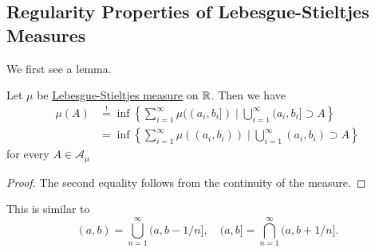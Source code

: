 \subsection{Regularity Properties of Lebesgue-Stieltjes Measures}
We first see a lemma.
\begin{lemma}
	Let \(\mu\) be \hyperref[def:Lebesgue-Stieltjes-measure]{Lebesgue-Stieltjes measure} on \(\mathbb{\MakeUppercase{r}} \). Then we have
	\[
		\begin{split}
			\mu (A) &\overset{\hyperref[prop:outer-measure]{!}}{=}\inf\left\{\sum\limits_{i=1}^{\infty} \mu ((a_{i}, b_{i}]) \mid \bigcup\limits_{i=1}^{\infty} (a_{i}, b_{i}]\supset A\right\}\\
			&= \inf\left\{\sum\limits_{i=1}^{\infty} \mu ((a_{i}, b_{i})) \mid \bigcup\limits_{i=1}^{\infty} (a_{i}, b_{i})\supset A\right\}
		\end{split}
	\]
	for every \(A\in \mathcal{A} _\mu \)
\end{lemma}
\begin{proof}
	The second equality follows from the continuity of the measure.
\end{proof}
\begin{remark}
	This is similar to
	\[
		(a, b) = \bigcup\limits_{n=1}^{\infty} (a, b - 1/n],\quad (a, b] = \bigcap\limits_{n=1}^{\infty} (a, b+1/n].
	\]
\end{remark}
